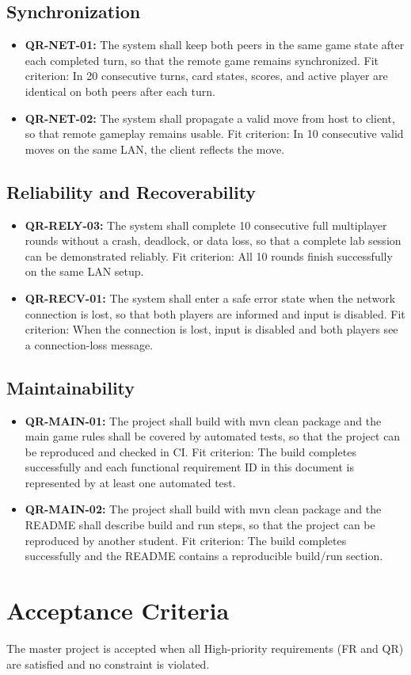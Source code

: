 \documentclass[a4paper,12pt]{article}
\begin{document}
    \subsection{Synchronization}
    \begin{itemize}
        \item \textbf{QR-NET-01:} The system shall keep both peers in the same game state after each completed turn, so that the remote game remains synchronized. Fit criterion: In 20 consecutive turns, card states, scores, and active player are identical on both peers after each turn.
        \item \textbf{QR-NET-02:} The system shall propagate a valid move from host to client, so that remote gameplay remains usable. Fit criterion: In 10 consecutive valid moves on the same LAN, the client reflects the move.
    \end{itemize}

    \subsection{Reliability and Recoverability}
    \begin{itemize}
        \item \textbf{QR-RELY-03:} The system shall complete 10 consecutive full multiplayer rounds without a crash, deadlock, or data loss, so that a complete lab session can be demonstrated reliably. Fit criterion: All 10 rounds finish successfully on the same LAN setup.
        \item \textbf{QR-RECV-01:} The system shall enter a safe error state when the network connection is lost, so that both players are informed and input is disabled. Fit criterion: When the connection is lost, input is disabled and both players see a connection-loss message.
    \end{itemize}

    \subsection{Maintainability}
    \begin{itemize}
        \item \textbf{QR-MAIN-01:} The project shall build with mvn clean package and the main game rules shall be covered by automated tests, so that the project can be reproduced and checked in CI. Fit criterion: The build completes successfully and each functional requirement ID in this document is represented by at least one automated test.
        \item \textbf{QR-MAIN-02:} The project shall build with mvn clean package and the README shall describe build and run steps, so that the project can be reproduced by another student. Fit criterion: The build completes successfully and the README contains a reproducible build/run section.
    \end{itemize}

    \section{Acceptance Criteria}
    The master project is accepted when all High-priority requirements (FR and QR) are satisfied and no constraint is violated.
\end{document}
